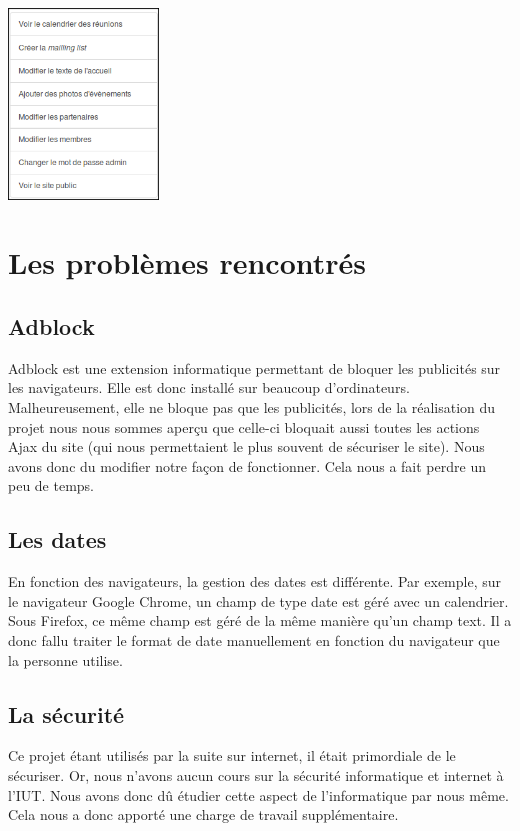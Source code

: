 \documentclass[11pt,a4paper,titlepage]{report}
\begin{document}
\begin{center}
\includegraphics[width=0.3\textwidth]{gestion.png}~
\end{center}

\chapter{Les problèmes rencontrés}

\section{Adblock} 
Adblock est une extension informatique permettant de bloquer les publicités sur les navigateurs. Elle est donc installé sur beaucoup d'ordinateurs. 
Malheureusement, elle ne bloque pas que les publicités, lors de la réalisation du projet nous nous sommes aperçu que celle-ci bloquait aussi toutes les actions Ajax du site (qui nous permettaient le plus souvent de sécuriser le site).
Nous avons donc du modifier notre façon de fonctionner. Cela nous a fait perdre un peu de temps.

\section{Les dates}
En fonction des navigateurs, la gestion des dates est différente. Par exemple, sur le navigateur Google Chrome, un champ de type date est géré avec un calendrier. Sous Firefox, ce même champ est géré de la même manière qu'un champ text. Il a donc fallu traiter le format de date manuellement en fonction du navigateur que la personne utilise.

\section{La sécurité}
Ce projet étant utilisés par la suite sur internet, il était primordiale de le sécuriser. Or, nous n'avons aucun cours sur la sécurité informatique et internet à l'IUT. Nous avons donc dû étudier cette aspect de l'informatique par nous même. Cela nous a donc apporté une charge de travail supplémentaire.
\end{document}
